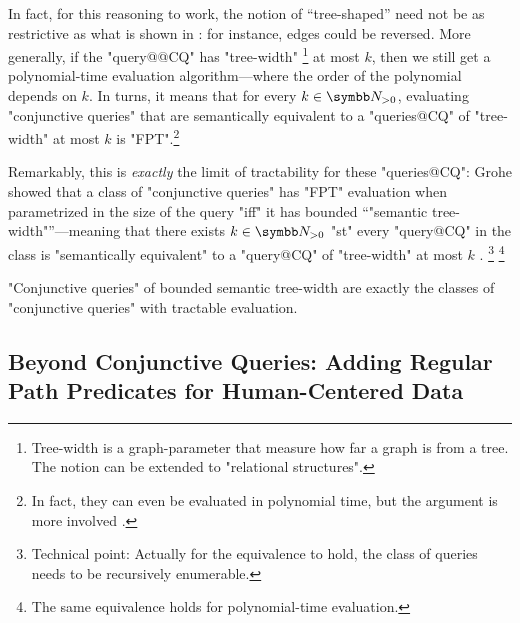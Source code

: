 In fact, for this reasoning to work, the notion of ``tree-shaped'' need not
be as restrictive as what is shown in : for instance,
edges could be reversed. More generally, if the "query@@CQ" has "tree-width"%
\footnote{Tree-width is a graph-parameter that measure how far a graph is from a tree.
The notion can be extended to "relational structures".}
at most $k$, then we still get a polynomial-time evaluation algorithm---where the order
of the polynomial depends on $k$. In turns, it means that for every $k\in\Np$,
evaluating "conjunctive queries" that are semantically equivalent to
a "queries@CQ" of "tree-width" at most $k$ is "FPT".\footnote{In fact,
they can even be evaluated in polynomial time, but the argument is more involved
\cite{ChekuriRajaraman2000TreeWidthPolytime}.}

Remarkably, this is \emph{exactly} the limit of tractability for these "queries@CQ":
Grohe showed that a class of "conjunctive queries" has "FPT" evaluation when parametrized in the 
size of the query "iff"
it has bounded ``"semantic tree-width"''---meaning that there exists $k\in\Np$ "st"
every "query@CQ" in the class is "semantically equivalent" to a "query@CQ" 
of "tree-width" at most $k$ \cite{Grohe2007ComplexityHomomorphism}.%
\footnote{Technical point: Actually for the equivalence to hold, the class of queries
needs to be recursively enumerable.}%
\footnote{The same equivalence holds for polynomial-time evaluation.}

\begin{known}
	"Conjunctive queries" of bounded semantic tree-width are exactly
	the classes of "conjunctive queries" with tractable evaluation.
\end{known}


\subsection{Beyond Conjunctive Queries: Adding Regular Path Predicates for Human-Centered Data}

